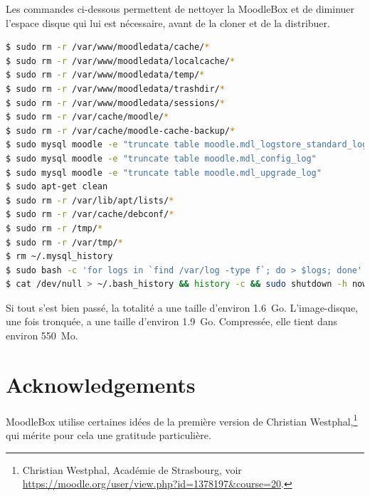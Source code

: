 \documentclass[12pt]{article}
\begin{document}
Les commandes ci-dessous permettent de nettoyer la MoodleBox et de diminuer l'espace disque qui lui est nécessaire, avant de la cloner et de la distribuer.

\begin{lstlisting}[language=bash]
$ sudo rm -r /var/www/moodledata/cache/*
$ sudo rm -r /var/www/moodledata/localcache/*
$ sudo rm -r /var/www/moodledata/temp/*
$ sudo rm -r /var/www/moodledata/trashdir/*
$ sudo rm -r /var/www/moodledata/sessions/*
$ sudo rm -r /var/cache/moodle/*
$ sudo rm -r /var/cache/moodle-cache-backup/*
$ sudo mysql moodle -e "truncate table moodle.mdl_logstore_standard_log"
$ sudo mysql moodle -e "truncate table moodle.mdl_config_log"
$ sudo mysql moodle -e "truncate table moodle.mdl_upgrade_log"
$ sudo apt-get clean
$ sudo rm -r /var/lib/apt/lists/*
$ sudo rm -r /var/cache/debconf/*
$ sudo rm -r /tmp/*
$ sudo rm -r /var/tmp/*
$ rm ~/.mysql_history
$ sudo bash -c 'for logs in `find /var/log -type f`; do > $logs; done'
$ cat /dev/null > ~/.bash_history && history -c && sudo shutdown -h now
\end{lstlisting}

Si tout s'est bien passé, la totalité a une taille d'environ 1.6~Go.
L'image-disque, une fois tronquée, a une taille d'environ 1.9~Go.
Compressée, elle tient dans environ 550~Mo.

\section{Acknowledgements}

MoodleBox utilise certaines idées de la première version de Christian Westphal,\footnote{Christian Westphal, Académie de Strasbourg, voir \url{https://moodle.org/user/view.php?id=1378197&course=20}.} qui mérite pour cela une gratitude particulière.
\end{document}
